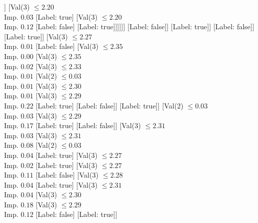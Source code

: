 \documentclass[margin=10pt]{standalone}
\begin{document}
\begin{forest}
																				]
																			[Val($3$) $ \leq 2.20$ \\ Imp. $0.03$
																				[Label: true]
																				[Val($3$) $ \leq 2.20$ \\ Imp. $0.12$
																					[Label: false]
																					[Label: true]]]]]]
																[Label: false]]
															[Label: true]]
														[Label: false]]
													[Label: true]]
												[Val($3$) $ \leq 2.27$ \\ Imp. $0.01$
													[Label: false]
													[Val($3$) $ \leq 2.35$ \\ Imp. $0.00$
														[Val($3$) $ \leq 2.35$ \\ Imp. $0.02$
															[Val($3$) $ \leq 2.33$ \\ Imp. $0.01$
																[Val($2$) $ \leq 0.03$ \\ Imp. $0.01$
																	[Val($3$) $ \leq 2.30$ \\ Imp. $0.01$
																		[Val($3$) $ \leq 2.29$ \\ Imp. $0.22$
																			[Label: true]
																			[Label: false]]
																		[Label: true]]
																	[Val($2$) $ \leq 0.03$ \\ Imp. $0.03$
																		[Val($3$) $ \leq 2.29$ \\ Imp. $0.17$
																			[Label: true]
																			[Label: false]]
																		[Val($3$) $ \leq 2.31$ \\ Imp. $0.03$
																			[Val($3$) $ \leq 2.31$ \\ Imp. $0.08$
																				[Val($2$) $ \leq 0.03$ \\ Imp. $0.04$
																					[Label: true]
																					[Val($3$) $ \leq 2.27$ \\ Imp. $0.02$
																						[Label: true]
																						[Val($3$) $ \leq 2.27$ \\ Imp. $0.11$
																							[Label: false]
																							[Val($3$) $ \leq 2.28$ \\ Imp. $0.04$
																								[Label: true]
																								[Val($3$) $ \leq 2.31$ \\ Imp. $0.04$
																									[Val($3$) $ \leq 2.30$ \\ Imp. $0.18$
																										[Val($3$) $ \leq 2.29$ \\ Imp. $0.12$
																											[Label: false]
																											[Label: true]]

\end{forest}
\end{document}
